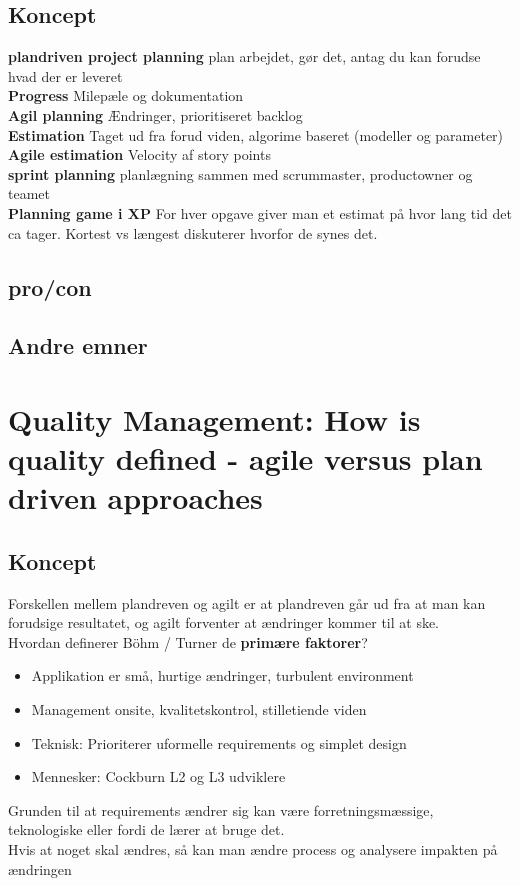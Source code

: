 \documentclass[11pt,a4paper]{article}
\begin{document}
\subsection{Koncept}
\textbf{plandriven project planning} plan arbejdet, gør det, antag du kan forudse hvad der er leveret\\
\textbf{Progress} Milepæle og dokumentation\\
\textbf{Agil planning} Ændringer, prioritiseret backlog\\
\textbf{Estimation} Taget ud fra forud viden, algorime baseret (modeller og parameter)\\
\textbf{Agile estimation} Velocity af story points\\
\textbf{sprint planning} planlægning sammen med scrummaster, productowner og teamet\\
\textbf{Planning game i XP} For hver opgave giver man et estimat på hvor lang tid det ca tager. Kortest vs længest diskuterer hvorfor de synes det.
\subsection{pro/con}
\subsection{Andre emner}
\newpage
\section{Quality Management: How is quality defined - agile versus plan driven approaches}
\subsection{Koncept}
Forskellen mellem plandreven og agilt er at plandreven går ud fra at man kan forudsige resultatet, og agilt forventer at ændringer kommer til at ske.\\
Hvordan definerer Böhm / Turner de \textbf{primære faktorer}?
\begin{itemize}
\item Applikation er små, hurtige ændringer, turbulent environment
\item Management onsite, kvalitetskontrol, stilletiende viden
\item Teknisk: Prioriterer uformelle requirements og simplet design
\item Mennesker: Cockburn L2 og L3 udviklere
\end{itemize}
Grunden til at requirements ændrer sig kan være forretningsmæssige, teknologiske eller fordi de lærer at bruge det.\\
Hvis at noget skal ændres, så kan man ændre process og analysere impakten på ændringen
\end{document}
